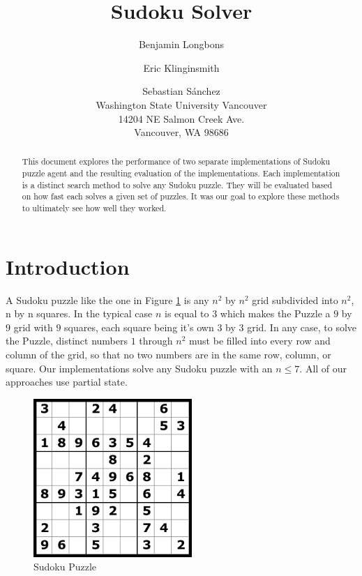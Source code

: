 \documentclass[letterpaper]{article}
\begin{document}
\title{Sudoku Solver}
\author{
	Benjamin Longbons\and
    Eric Klinginsmith \and
    Sebastian S\'{a}nchez \\
Washington State University Vancouver \\
14204 NE Salmon Creek Ave. \\
Vancouver, WA 98686
}

\maketitle
\begin{abstract}
This document explores the performance of two separate implementations of Sudoku puzzle agent and the resulting evaluation of the implementations. Each implementation is a distinct search method to solve any Sudoku puzzle. They will be evaluated based on how fast each solves a given set of puzzles. It was our goal to explore these methods to ultimately see how well they worked.
\end{abstract}

\section{Introduction}

A Sudoku puzzle like the one in Figure \ref{fig:sudoku-puzzle} is any $ n^{2} $ by $ n^{2} $ grid subdivided into $ n^{2} $, n by n squares. In the typical case $ n $ is equal to $3$ which makes the Puzzle a $9$ by $9$ grid with $9$ squares, each square being it's own $3$ by $3$ grid. In any case, to solve the Puzzle, distinct numbers $1$ through $ n^{2} $ must be filled into every row and column of the grid, so that no two numbers are in the same row, column, or square. Our implementations solve any Sudoku puzzle with an $n \le 7$. All of our approaches use partial state.

\begin{figure}[h]
	\centering
	\includegraphics[width=60mm]{./Sudoku-games.png}
	\caption{Sudoku Puzzle}
	\label{fig:sudoku-puzzle}
\end{figure}
\end{document}
